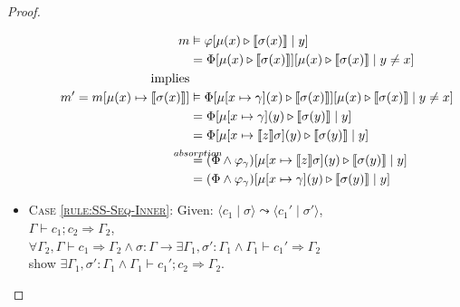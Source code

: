 \documentclass[twoside, english]{sdqthesis}
\newcommand{\tuple}[2]{\langle #1 \mid #2 \rangle}
\newcommand{\bbracket}[1]{\llbracket #1 \rrbracket}
\newcommand{\tr}[0]{\triangleright}
\theoremstyle{definition}
\begin{document}
\begin{proof}
\begin{itemize}
\begin{itemize}
        \begin{align*}
          m  &\vDash \varphi[\mu(x) \tr \bbracket{\sigma(x)} \mid y]
          \\ &= \Phi[\mu(x) \tr \bbracket{\sigma(x)}][\mu(x) \tr \bbracket{\sigma(x)} \mid y \neq x]
          \\ \text{implies} 
          \\ m' = m[\mu(x) \mapsto \bbracket{\sigma(x)}] &\vDash \Phi[\mu[x \mapsto \gamma](x) \tr \bbracket{\sigma(x)}][\mu(x) \tr \bbracket{\sigma(x)} \mid y \neq x]
          \\ &= \Phi[\mu[x \mapsto \gamma](y) \tr \bbracket{\sigma(y)} \mid y]
          \\ &= \Phi[\mu[x \mapsto \bbracket{z}\sigma](y) \tr \bbracket{\sigma(y)} \mid y]
          \\ &\overset{\mathclap{absorption}}{=} (\Phi \wedge \varphi_\gamma)[\mu[x \mapsto \bbracket{z}\sigma](y) \tr \bbracket{\sigma(y)} \mid y]
          \\ &= (\Phi \wedge \varphi_\gamma)[\mu[x \mapsto \gamma](y) \tr \bbracket{\sigma(y)} \mid y]
          \\ 
        \end{align*}
    \end{itemize} 
    




  \item \textsc{Case \cref{rule:SS-Seq-Inner}}:
    Given: $\tuple{c_1}{\sigma} \leadsto \tuple{c_1'}{\sigma'}$, \\
     $\Gamma \vdash c_1 ; c_2 \Rightarrow \Gamma_2$, \\
     $\forall \Gamma_2, \Gamma \vdash c_1 \Rightarrow \Gamma_2 \wedge \sigma : \Gamma \to \exists \Gamma_1, \sigma' : \Gamma_1 \wedge \Gamma_1 \vdash c_1' \Rightarrow \Gamma_2$ \\
    show $\exists \Gamma_1, \sigma' : \Gamma_1 \wedge \Gamma_1 \vdash c_1' ; c_2  \Rightarrow \Gamma_2$.


\end{itemize}
\end{proof}
\end{document}
